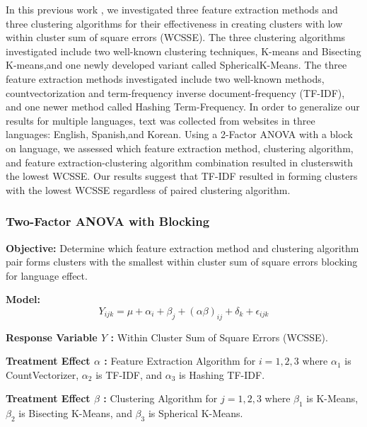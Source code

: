 \documentclass[12pt]{article}
\begin{document}
In this previous work \cite{previous}, we investigated three feature extraction methods and three clustering algorithms for their effectiveness in creating clusters with low within cluster sum of square errors (WCSSE). The three clustering algorithms investigated include two well-known clustering techniques, K-means and Bisecting K-means,and one newly developed variant called SphericalK-Means. The three feature extraction methods investigated include two well-known methods, countvectorization and term-frequency inverse document-frequency (TF-IDF), and one newer method called Hashing Term-Frequency. In order to generalize our results for multiple languages, text was collected from websites in three languages: English, Spanish,and Korean. Using a 2-Factor ANOVA with a block on language, we assessed which feature extraction method, clustering algorithm, and feature extraction-clustering algorithm combination resulted in clusterswith the lowest WCSSE. Our results suggest that TF-IDF resulted in forming clusters with the lowest WCSSE regardless of paired clustering algorithm.

\subsubsection{Two-Factor ANOVA with Blocking}

\textbf{Objective:} Determine which feature extraction method and clustering algorithm pair forms clusters with the smallest within cluster sum of square errors blocking for language effect.
\vspace{5mm}  

\textbf{Model:}
\begin{equation}
Y_{ijk} = \mu + \alpha_{i} + \beta_{j} + (\alpha\beta)_{ij} + \delta_{k} + \epsilon_{ijk}
\end{equation}


\textbf{Response Variable $Y$ :} Within Cluster Sum of Square Errors (WCSSE). 
\vspace{3mm}  

\textbf{Treatment Effect $\alpha$ :} Feature Extraction Algorithm for $i = 1,2,3 $ where $\alpha_{1}$ is CountVectorizer, $\alpha_{2}$ is TF-IDF, and $\alpha_{3}$ is Hashing TF-IDF.
\vspace{3mm}  

\textbf{Treatment Effect $\beta$ :} Clustering Algorithm for $j = 1,2,3$ where
$\beta_{1}$ is K-Means,
$\beta_{2}$ is Bisecting K-Means, and
$\beta_{3}$ is Spherical K-Means.
\vspace{3mm}  
\end{document}
